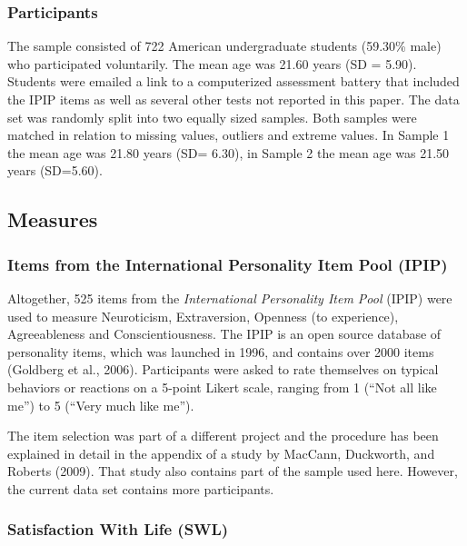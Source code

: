 \documentclass[,man]{apa6}
\theoremstyle{definition}
\theoremstyle{definition}
\theoremstyle{definition}
\theoremstyle{remark}
\begin{document}
\hypertarget{participants}{%
\subsubsection{Participants}\label{participants}}

The sample consisted of 722 American undergraduate students (59.30\%
male) who participated voluntarily. The mean age was 21.60 years (SD =
5.90). Students were emailed a link to a computerized assessment battery
that included the IPIP items as well as several other tests not reported
in this paper. The data set was randomly split into two equally sized
samples. Both samples were matched in relation to missing values,
outliers and extreme values. In Sample 1 the mean age was 21.80 years
(SD= 6.30), in Sample 2 the mean age was 21.50 years (SD=5.60).

\hypertarget{measures}{%
\subsection{Measures}\label{measures}}

\hypertarget{items-from-the-international-personality-item-pool-ipip}{%
\subsubsection{Items from the International Personality Item Pool
(IPIP)}\label{items-from-the-international-personality-item-pool-ipip}}

Altogether, 525 items from the \emph{International Personality Item
Pool} (IPIP) were used to measure Neuroticism, Extraversion, Openness
(to experience), Agreeableness and Conscientiousness. The IPIP is an
open source database of personality items, which was launched in 1996,
and contains over 2000 items (Goldberg et al., 2006). Participants were
asked to rate themselves on typical behaviors or reactions on a 5-point
Likert scale, ranging from 1 (\enquote{Not all like me}) to 5
(\enquote{Very much like me}).

The item selection was part of a different project and the procedure has
been explained in detail in the appendix of a study by MacCann,
Duckworth, and Roberts (2009). That study also contains part of the
sample used here. However, the current data set contains more
participants.

\hypertarget{satisfaction-with-life-swl}{%
\subsubsection{Satisfaction With Life
(SWL)}\label{satisfaction-with-life-swl}}
\end{document}

